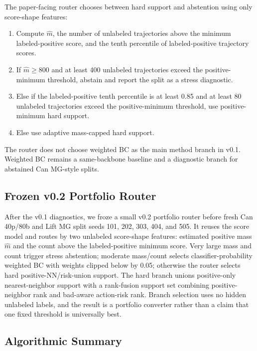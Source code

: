 \documentclass[11pt]{article}
\begin{document}
The paper-facing router chooses between hard support and abstention using only score-shape features:
\begin{enumerate}[leftmargin=*]
  \item Compute $\hat{m}$, the number of unlabeled trajectories above the minimum labeled-positive score, and the tenth percentile of labeled-positive trajectory scores.
  \item If $\hat{m}\ge 800$ and at least 400 unlabeled trajectories exceed the positive-minimum threshold, abstain and report the split as a stress diagnostic.
  \item Else if the labeled-positive tenth percentile is at least 0.85 and at least 80 unlabeled trajectories exceed the positive-minimum threshold, use positive-minimum hard support.
  \item Else use adaptive mass-capped hard support.
\end{enumerate}
The router does not choose weighted BC as the main method branch in v0.1. Weighted BC remains a same-backbone baseline and a diagnostic branch for abstained Can MG-style splits.

\subsection{Frozen v0.2 Portfolio Router}

After the v0.1 diagnostics, we froze a small v0.2 portfolio router before fresh Can 40p/80b and Lift MG split seeds 101, 202, 303, 404, and 505. It reuses the score model and routes by two unlabeled score-shape features: estimated positive mass $\hat{m}$ and the count above the labeled-positive minimum score. Very large mass and count trigger stress abstention; moderate mass/count selects classifier-probability weighted BC with weights clipped below by 0.05; otherwise the router selects hard positive-NN/risk-union support. The hard branch unions positive-only nearest-neighbor support with a rank-fusion support set combining positive-neighbor rank and bad-aware action-risk rank. Branch selection uses no hidden unlabeled labels, and the result is a portfolio converter rather than a claim that one fixed threshold is universally best.

\subsection{Algorithmic Summary}
\end{document}
